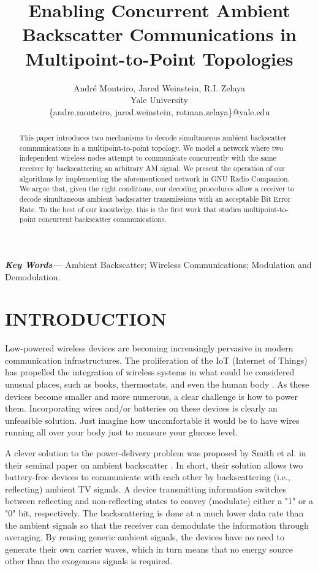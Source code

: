 \documentclass[letterpaper, 10 pt, conference]{IEEEconf}
\title{\LARGE \bf
Enabling Concurrent Ambient Backscatter Communications in Multipoint-to-Point Topologies
}
\author{Andr{\'e} Monteiro, Jared Weinstein, R.I. Zelaya\\
Yale University\\
\{andre.monteiro, jared.weinstein, rotman.zelaya\}@yale.edu
}
\providecommand{\keywords}[1]{\textbf{\textit{Key Words---}} #1}
\begin{document}
\nocite{*}

\maketitle
\thispagestyle{fancy}
\pagestyle{fancy}



\begin{abstract}

This paper introduces two mechanisms to decode simultaneous ambient backscatter communications in a multipoint-to-point topology. We model a network where two independent wireless nodes attempt to communicate concurrently with the same receiver by backscattering an arbitrary AM signal. We present the operation of our algorithms by implementing the aforementioned network in GNU Radio Companion. We argue that, given the right conditions, our decoding procedures allow a receiver to decode simultaneous ambient backscatter transmissions with an acceptable Bit Error Rate. To the best of our knowledge, this is the first work that studies multipoint-to-point concurrent backscatter communications. 

\end{abstract}
\keywords{Ambient Backscatter; Wireless Communications; Modulation and Demodulation.}


\section{INTRODUCTION}

Low-powered wireless devices are becoming increasingly pervasive in modern communication infrastructures. The proliferation of the IoT (Internet of Things) has propelled the integration of wireless systems in what could be considered unusual places, such as books, thermostats, and even the human body \cite{jang2016stent}. As these devices become smaller and more numerous, a clear challenge is how to power them. Incorporating wires and/or batteries on these devices is clearly an unfeasible solution. Just imagine how uncomfortable it would be to have wires running all over your body just to measure your glucose level.

A clever solution to the power-delivery problem was proposed by Smith et al. in their seminal paper on ambient backscatter \cite{liu2013ambient}. In short, their solution allows two battery-free devices to communicate with each other by backscattering (i.e., reflecting) ambient TV signals. A device transmitting information switches between reflecting and non-reflecting states to convey (modulate) either a "1" or a "0" bit, respectively. The backscattering is done at a much lower data rate than the ambient signals so that the receiver can demodulate the information through averaging. By reusing generic ambient signals, the devices have no need to generate their own carrier waves, which in turn means that no energy source other than the exogenous signals is required.
\end{document}
